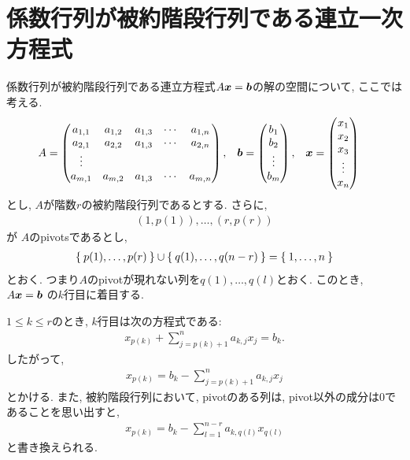 \section{係数行列が被約階段行列である連立一次方程式}
係数行列が被約階段行列である連立方程式$A\boldsymbol{x}=\boldsymbol{b}$の解の空間について,
ここでは考える.
\begin{align*}
  A&=
  \begin{pmatrix}
    a_{1,1}&a_{1,2}&a_{1,3}&\cdots & a_{1,n}\\
    a_{2,1}&a_{2,2}&a_{1,3}&\cdots & a_{2,n}\\
    \vdots&\\
    a_{m,1}&a_{m,2}&a_{1,3}&\cdots & a_{m,n}
  \end{pmatrix},
  &
  \boldsymbol{b}
  &=
  \begin{pmatrix}
    b_1\\b_2\\\vdots\\b_m
  \end{pmatrix},
  &
  \boldsymbol{x}
  &=
  \begin{pmatrix}
    x_1\\x_2\\x_3\\\vdots\\x_n
  \end{pmatrix}
\end{align*}
とし,
$A$が階数$r$の被約階段行列であるとする.
さらに,
\begin{align*}
  (1,p(1)),\ldots,(r,p(r))
\end{align*}
  が
$A$のpivotsであるとし,
\begin{align*}
  \Set{p(1),\ldots,p(r)}\cup\Set{q(1),\ldots,q(n-r)}=\Set{1,\ldots,n}
\end{align*}
とおく.
つまり$A$のpivotが現れない列を$q(1),\ldots,q(l)$とおく.
このとき,
$A\boldsymbol{x}=\boldsymbol{b}$
の$k$行目に着目する.

$1\leq k \leq r$のとき,
$k$行目は次の方程式である:
\begin{align*}
  x_{p(k)}+\sum_{j=p(k)+1}^{n}a_{k,j}x_j=b_k.
\end{align*}
したがって,
\begin{align}
  x_{p(k)}=b_k-\sum_{j=p(k)+1}^{n}a_{k,j}x_j
\end{align}
とかける.
また, 被約階段行列において, pivotのある列は,
pivot以外の成分は$0$であることを思い出すと,
\begin{align}
  x_{p(k)}=b_k-\sum_{l=1}^{n-r}a_{k,q(l)}x_{q(l)}
  \label{eq:step:eq:1}
\end{align}
と書き換えられる.

